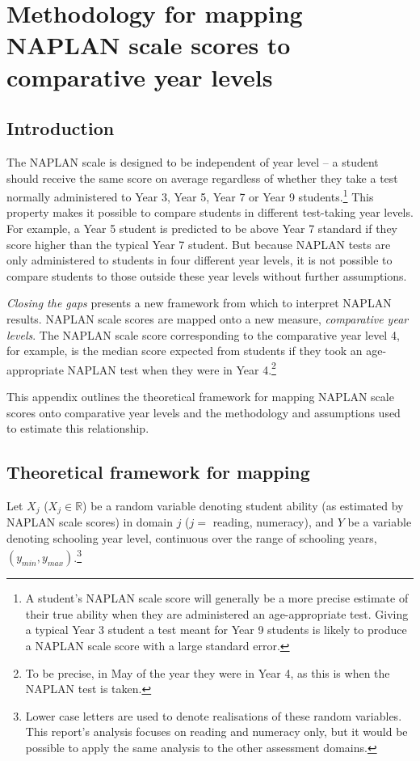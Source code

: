 \chapter{Methodology for mapping NAPLAN scale scores to comparative year levels} \label{chap3}

\section{Introduction}

The NAPLAN scale is designed to be independent of year level -- a student should receive the same score on average regardless of whether they take a test normally administered to Year 3, Year 5, Year 7 or Year 9 students.\footnote{A student's NAPLAN scale score will generally be a more precise estimate of their true ability when they are administered an age-appropriate test. Giving a typical Year 3 student a test meant for Year 9 students is likely to produce a NAPLAN scale score with a large standard error.} This property makes it possible to compare students in different test-taking year levels. For example, a Year 5 student is predicted to be above Year 7 standard if they score higher than the typical Year 7 student. But because NAPLAN tests are only administered to students in four different year levels, it is not possible to compare students to those outside these year levels without further assumptions.

\textit{Closing the gaps} presents a new framework from which to interpret NAPLAN results. NAPLAN scale scores are mapped onto a new measure, \textit{comparative year levels}. The NAPLAN scale score corresponding to the comparative year level 4, for example, is the median score expected from students if they took an age-appropriate NAPLAN test when they were in Year 4.\footnote{To be precise, in May of the year they were in Year 4, as this is when the NAPLAN test is taken.}  

This appendix outlines the theoretical framework for mapping NAPLAN scale scores onto comparative year levels and the methodology and assumptions used to estimate this relationship.

\section{Theoretical framework for mapping} \label{sec:theoretical}

Let $X_{j}$ ($X_{j} \in \mathbb{R}$) be a random variable denoting student ability (as estimated by NAPLAN scale scores) in domain ${j}$ ($j = $ reading, numeracy), and $Y$ be a variable denoting schooling year level, continuous over the range of schooling years, $\left(y_{min},y_{max}\right)$.\footnote{Lower case letters are used to denote realisations of these random variables. This report's analysis focuses on reading and numeracy only, but it would be possible to apply the same analysis to the other assessment domains.}

